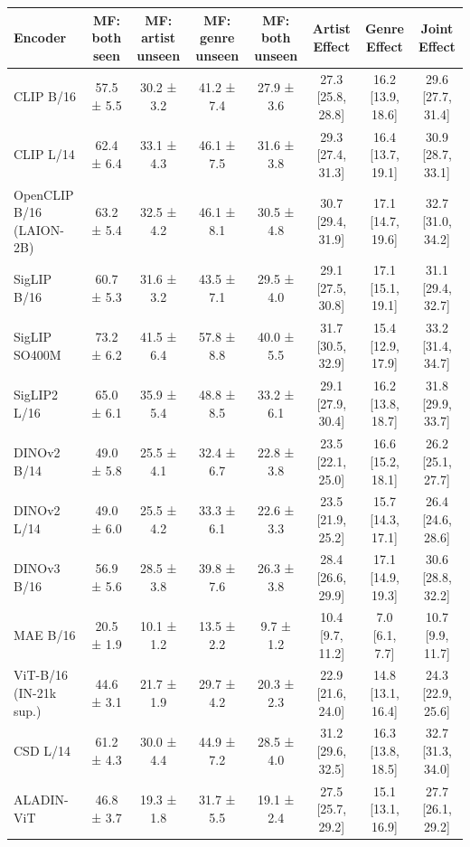\begin{tabular}{lccccccc}
\toprule
Encoder & MF: both seen & MF: artist unseen & MF: genre unseen & MF: both unseen & Artist Effect & Genre Effect & Joint Effect \\
\midrule
CLIP B/16 & 57.5 ± 5.5 & 30.2 ± 3.2 & 41.2 ± 7.4 & 27.9 ± 3.6 & 27.3 [25.8, 28.8] & 16.2 [13.9, 18.6] & 29.6 [27.7, 31.4] \\
CLIP L/14 & 62.4 ± 6.4 & 33.1 ± 4.3 & 46.1 ± 7.5 & 31.6 ± 3.8 & 29.3 [27.4, 31.3] & 16.4 [13.7, 19.1] & 30.9 [28.7, 33.1] \\
OpenCLIP B/16 (LAION-2B) & 63.2 ± 5.4 & 32.5 ± 4.2 & 46.1 ± 8.1 & 30.5 ± 4.8 & 30.7 [29.4, 31.9] & 17.1 [14.7, 19.6] & 32.7 [31.0, 34.2] \\
SigLIP B/16 & 60.7 ± 5.3 & 31.6 ± 3.2 & 43.5 ± 7.1 & 29.5 ± 4.0 & 29.1 [27.5, 30.8] & 17.1 [15.1, 19.1] & 31.1 [29.4, 32.7] \\
SigLIP SO400M & 73.2 ± 6.2 & 41.5 ± 6.4 & 57.8 ± 8.8 & 40.0 ± 5.5 & 31.7 [30.5, 32.9] & 15.4 [12.9, 17.9] & 33.2 [31.4, 34.7] \\
SigLIP2 L/16 & 65.0 ± 6.1 & 35.9 ± 5.4 & 48.8 ± 8.5 & 33.2 ± 6.1 & 29.1 [27.9, 30.4] & 16.2 [13.8, 18.7] & 31.8 [29.9, 33.7] \\
DINOv2 B/14 & 49.0 ± 5.8 & 25.5 ± 4.1 & 32.4 ± 6.7 & 22.8 ± 3.8 & 23.5 [22.1, 25.0] & 16.6 [15.2, 18.1] & 26.2 [25.1, 27.7] \\
DINOv2 L/14 & 49.0 ± 6.0 & 25.5 ± 4.2 & 33.3 ± 6.1 & 22.6 ± 3.3 & 23.5 [21.9, 25.2] & 15.7 [14.3, 17.1] & 26.4 [24.6, 28.6] \\
DINOv3 B/16 & 56.9 ± 5.6 & 28.5 ± 3.8 & 39.8 ± 7.6 & 26.3 ± 3.8 & 28.4 [26.6, 29.9] & 17.1 [14.9, 19.3] & 30.6 [28.8, 32.2] \\
MAE B/16 & 20.5 ± 1.9 & 10.1 ± 1.2 & 13.5 ± 2.2 & 9.7 ± 1.2 & 10.4 [9.7, 11.2] & 7.0 [6.1, 7.7] & 10.7 [9.9, 11.7] \\
ViT-B/16 (IN-21k sup.) & 44.6 ± 3.1 & 21.7 ± 1.9 & 29.7 ± 4.2 & 20.3 ± 2.3 & 22.9 [21.6, 24.0] & 14.8 [13.1, 16.4] & 24.3 [22.9, 25.6] \\
CSD L/14 & 61.2 ± 4.3 & 30.0 ± 4.4 & 44.9 ± 7.2 & 28.5 ± 4.0 & 31.2 [29.6, 32.5] & 16.3 [13.8, 18.5] & 32.7 [31.3, 34.0] \\
ALADIN-ViT & 46.8 ± 3.7 & 19.3 ± 1.8 & 31.7 ± 5.5 & 19.1 ± 2.4 & 27.5 [25.7, 29.2] & 15.1 [13.1, 16.9] & 27.7 [26.1, 29.2] \\
\bottomrule
\end{tabular}
